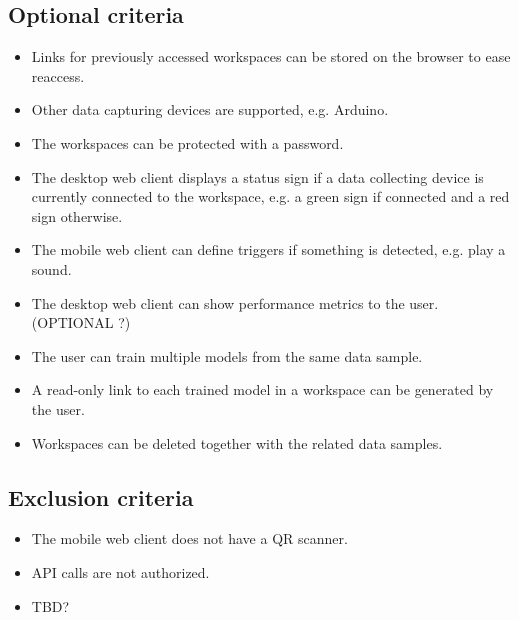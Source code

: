 \subsection{Optional criteria}
\begin{itemize}
    \item Links for previously accessed workspaces can be stored on the browser to ease reaccess. %
    \item Other data capturing devices are supported, e.g. Arduino.
    \item The workspaces can be protected with a password.
    \item The desktop web client displays a status sign if a data collecting device is currently connected to the workspace, e.g. a green sign if connected and a red sign otherwise.
    \item The mobile web client can define triggers if something is detected, e.g. play a sound. %
    \item The desktop web client can show performance metrics to the user. (OPTIONAL ?)
    \item The user can train multiple models from the same data sample. %
    \item A read-only link to each trained model in a workspace can be generated by the user.
    \item Workspaces can be deleted together with the related data samples.
\end{itemize}

\subsection{Exclusion criteria}
\begin{itemize}
    \item The mobile web client does not have a QR scanner.
    \item API calls are not authorized.
    \item TBD?
\end{itemize}

